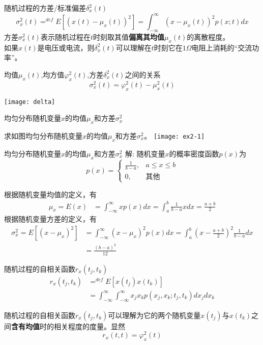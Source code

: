 \begin{frame}
\begin{block}{随机过程的方差/标准偏差$\delta_x^2(t)$}
\[\sigma_x^2(t)\mathop{=}^{def}E[(x(t)-\mu_x(t))^2]=\int_{-\infty}^{\infty}(x-\mu_x(t))^2p(x;t)dx \]
方差$\sigma_x^2(t)$表示随机过程在$t$时刻取其值\textbf{偏离其均值}$\mu_x(t)$的离散程度。\\
如果$x(t)$是电压或电流，则$\delta_x^2(t)$可以理解在$t$时刻它在$1\Omega$电阻上消耗的``交流功率''。
\end{block}
\begin{block}{均值$\mu_x(t)$,均方值$\varphi_x^2(t)$,方差$\delta_x^2(t)$之间的关系}
\[\sigma_x^2(t)=\varphi_x^2(t)-\mu_x^2(t)\]
\end{block}
\texttt{[image: delta]}
\end{frame}

\begin{frame}{均匀分布随机变量$x$的均值$\mu_x$和方差$\sigma_x^2$}
\begin{example}
	求如图均匀分布随机变量$x$的均值$\mu_x$和方差$\sigma_x^2$。
	\texttt{[image: ex2-1]}
\end{example}
\end{frame}

\begin{frame}{均匀分布随机变量$x$的均值$\mu_x$和方差$\sigma_x^2$}
解: 随机变量$x$的概率密度函数$p(x)$为
\[p(x)=\begin{cases}
\frac{1}{b-a}, &a\le x\le b\\
0, &\text{其他}
\end{cases} \]

根据随机变量均值的定义，有
\begin{align*}
\mu_x=E(x)&=\int_{-\infty}^{\infty}xp(x)dx=\int_{a}^{b}\frac{1}{b-a}xdx =\frac{a+b}{2}
\end{align*}
根据随机变量方差的定义，有
\begin{align*}
\sigma_x^2=E[(x-\mu_x)^2]&=\int_{-\infty}^{\infty}(x-\mu_x)^2p(x)dx=\int_{a}^{b}\left(x-\frac{a+b}{2}\right)^2\frac{1}{b-a}dx \\
&=\frac{(b-a)^2}{12}
\end{align*}	
\end{frame}

\begin{frame}
\begin{block}{随机过程的自相关函数$r_x(t_j,t_k)$}
\begin{align*}
r_x(t_j,t_k)&\mathop{=}^{def}E[x(t_j)x(t_k)]\\
&=\int_{-\infty}^{\infty}	\int_{-\infty}^{\infty}x_jx_kp(x_j,x_k;t_j,t_k)dx_jdx_k
\end{align*}
\end{block}
随机过程的自相关函数$r_x(t_j,t_k)$可以理解为它的两个随机变量$x(t_j)$与$x(t_k)$之间\textbf{含有均值}时的相关程度的度量。显然
\[r_x(t,t)=\varphi_x^2(t)\]
\end{frame}

